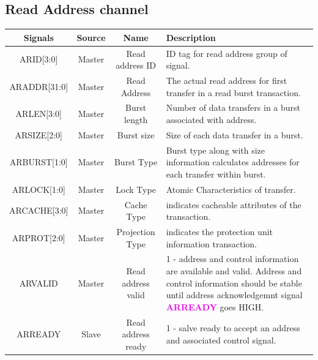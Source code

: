 \documentclass{article}
\newcommand{\AXISignals}[1]{\textbf{\textcolor{magenta}{#1}}}
\begin{document}
\subsection{Read Address channel}
\begin{table}[H]
    \begin{center}
        \begin{tabular}{c|c|c|p{9.5cm}}
            \textbf{Signals} & \textbf{Source} & \textbf{Name} & \textbf{Description}\\
            \hline
            ARID[3:0] & Master & Read address ID & ID tag for read address group of signal.\\
            ARADDR[31:0] & Master & Read Address & The actual read address for first transfer in a read burst transaction.\\
            ARLEN[3:0] & Master & Burst length & Number of data transfers in a burst associated with address.\\
            ARSIZE[2:0] & Master & Burst size & Size of each data transfer in a burst.\\
            ARBURST[1:0] & Master & Burst Type & Burst type along with size information calculates addresses for each transfer within burst.\\
            ARLOCK[1:0] & Master & Lock Type & Atomic Characteristics of transfer.\\
            ARCACHE[3:0] & Master & Cache Type & indicates cacheable attributes of the transaction.\\
            ARPROT[2:0] & Master & Projection Type & indicates the protection unit information transaction.\\
            ARVALID & Master & Read address valid & 1 - address and control information are available and valid. Address and control information should be stable until address acknowledgemnt signal \AXISignals{ARREADY} goes HIGH.\\
            ARREADY & Slave & Read address ready & 1 - salve ready to accept an address and associated control signal.\\
        \end{tabular}
    \end{center}
\end{table}
\end{document}
